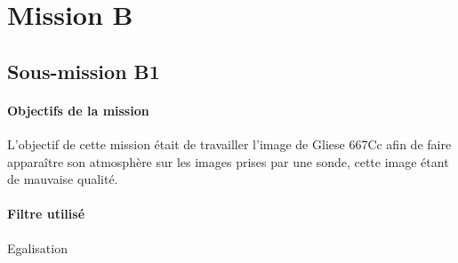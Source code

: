 \section{Mission B}
	\subsection{Sous-mission B1}

	\begin{vwcol}[widths={0.8,0.2}, rule=0pt]
	\begin{minipage}{0.7\textwidth}
	\paragraph{Objectifs de la mission}

	L'objectif de cette mission était de travailler l'image de Gliese 667Cc afin de faire apparaître son atmosphère sur les images prises par une sonde, cette image étant de mauvaise qualité. 
	\end{minipage}
	\begin{minipage}{0.2\textwidth}
		\begin{flushright}
			\paragraph{Filtre utilisé}
		Egalisation
		\end{flushright}
	\end{minipage}
	\end{vwcol} 

